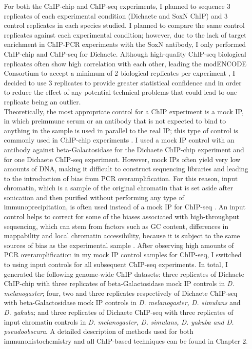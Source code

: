 For both the ChIP-chip and ChIP-seq experiments, I planned to sequence 3 replicates of each experimental condition (Dichaete and SoxN ChIP) and 3 control replicates in each species studied. I planned to compare the same control replicates against each experimental condition; however, due to the lack of target enrichment in ChIP-PCR experiments with the SoxN antibody, I only performed ChIP-chip and ChIP-seq for Dichaete. Although high-quality ChIP-seq biological replicates often show high correlation with each other, leading the modENCODE Consortium to accept a minimum of 2 biological replicates per experiment \citep{landt_chip-seq_2012}, I decided to use 3 replicates to provide greater statistical confidence and in order to reduce the effect of any potential technical problems that could lead to one replicate being an outlier. \\

Theoretically, the most appropriate control for a ChIP experiment is a mock IP, in which preimmune serum or an antibody that is not expected to bind to anything in the sample is used in parallel to the real IP; this type of control is commonly used in ChIP-chip experiments \citep{ghavi-helm_analyzing_2012, park_widespread_2013}. I used a mock IP control with an antibody against beta-Galactosidase for the Dichaete ChIP-chip experiment and for one Dichaete ChIP-seq experiment. However, mock IPs often yield very low amounts of DNA, making it difficult to construct sequencing libraries and leading to the introduction of bias from PCR overamplification. For this reason, input chromatin, which is a sample of the original chromatin that is set aside after sonication and then purified without performing any type of immunoprecipitation, is often used instead of a mock IP for ChIP-seq \citep{ghavi-helm_analyzing_2012}. An input control helps to correct for some of the biases associated with high-throughput sequencing, which can stem from factors such as GC content, differences in mappability and local chromatin accessibility, because it is subject to the same sources of bias as the experimental sample \citep{dohm_substantial_2008}. After observing high amounts of PCR overamplification in my mock IP control samples for ChIP-seq, I switched to using input controls for all subsequent ChIP-seq experiments. In total, I generated the following genome-wide ChIP datasets: three replicates of Dichaete ChIP-chip with three replicates of beta-Galactosidase mock IP controls in \emph{D. melanogaster}; four, two and three replicates respectively of Dichaete ChIP-seq with beta-Galactosidase mock IP controls in \emph{D. melanogaster, D. simulans} and \emph{D. yakuba}; and three replicates of Dichaete ChIP-seq with three replicates of input chromatin controls in \emph{D. melanogaster, D. simulans, D. yakuba and D. pseudoobscura}. A detailed description of methods used for both immunohistochemistry and all ChIP-based techniques can be found in Chapter 2.

